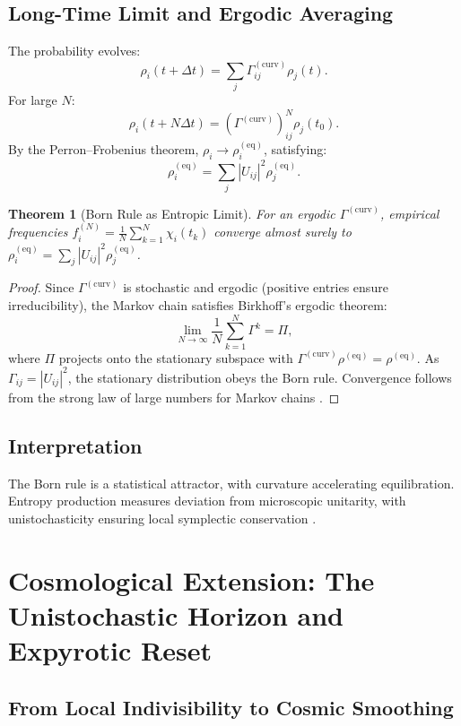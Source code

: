 \documentclass[12pt]{article}
\newtheorem{theorem}{Theorem}
\begin{document}
\subsection{Long-Time Limit and Ergodic Averaging}

The probability evolves:
\[
\rho_i(t + \Delta t) = \sum_j \Gamma_{ij}^{(\mathrm{curv})} \rho_j(t).
\]
For large \(N\):
\[
\rho_i(t + N \Delta t) = (\Gamma^{(\mathrm{curv})})^N_{ij} \rho_j(t_0).
\]
By the Perron–Frobenius theorem, \(\rho_i \to \rho_i^{(\mathrm{eq})}\), satisfying:
\[
\rho_i^{(\mathrm{eq})} = \sum_j |U_{ij}|^2 \rho_j^{(\mathrm{eq})}.
\]

\begin{theorem}[Born Rule as Entropic Limit]
\label{thm:bornlimit}
For an ergodic \(\Gamma^{(\mathrm{curv})}\), empirical frequencies \(f_i^{(N)} = \frac{1}{N} \sum_{k=1}^N \chi_i(t_k)\) converge almost surely to \(\rho_i^{(\mathrm{eq})} = \sum_j |U_{ij}|^2 \rho_j^{(\mathrm{eq})}\).
\end{theorem}

\begin{proof}
Since \(\Gamma^{(\mathrm{curv})}\) is stochastic and ergodic (positive entries ensure irreducibility), the Markov chain satisfies Birkhoff’s ergodic theorem:
\[
\lim_{N \to \infty} \frac{1}{N} \sum_{k=1}^N \Gamma^k = \Pi,
\]
where \(\Pi\) projects onto the stationary subspace with \(\Gamma^{(\mathrm{curv})} \rho^{(\mathrm{eq})} = \rho^{(\mathrm{eq})}\). As \(\Gamma_{ij} = |U_{ij}|^2\), the stationary distribution obeys the Born rule. Convergence follows from the strong law of large numbers for Markov chains \citep{Risken1996}.
\end{proof}

\subsection{Interpretation}

The Born rule is a statistical attractor, with curvature accelerating equilibration. Entropy production measures deviation from microscopic unitarity, with unistochasticity ensuring local symplectic conservation \citep{Pantev2013}.

\section{Cosmological Extension: The Unistochastic Horizon and Expyrotic Reset}

\subsection{From Local Indivisibility to Cosmic Smoothing}
\end{document}
